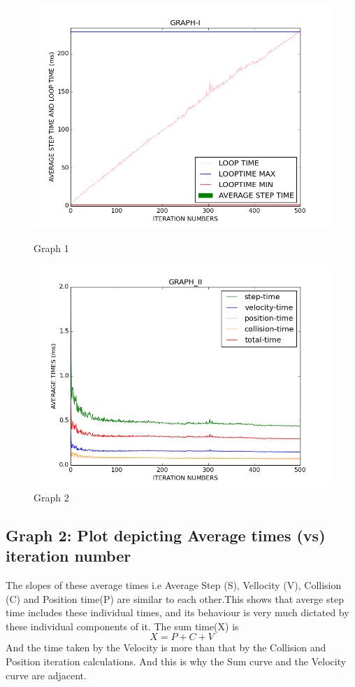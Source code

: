 \documentclass[11pt]{article}
\begin{document}
\begin{figure}
\begin{minipage}{.5\textwidth}
\includegraphics[scale=0.35]{./images/plot1.png}
\caption*{Graph 1}
\end{minipage}
\begin{minipage}{.5\textwidth}
\includegraphics*[scale=0.35]{./images/plot2.png}
\caption{Graph 2}
\end{minipage}
\end{figure}

\subsection*{Graph 2: Plot depicting Average times (vs) iteration number}
The slopes of these average times i.e Average Step (S), Vellocity (V), Collision (C) and Position time(P) are similar to each other.This shows that averge step time includes these individual times, and its behaviour is very much dictated by these individual components of it.\newline
The sum time(X) is
\begin{equation}
X=P+C+V
\end{equation}
\newline
And the time taken by the Velocity is more than that by the Collision and Position iteration calculations. And this is why the Sum curve
and the Velocity curve are adjacent.
\end{document}
